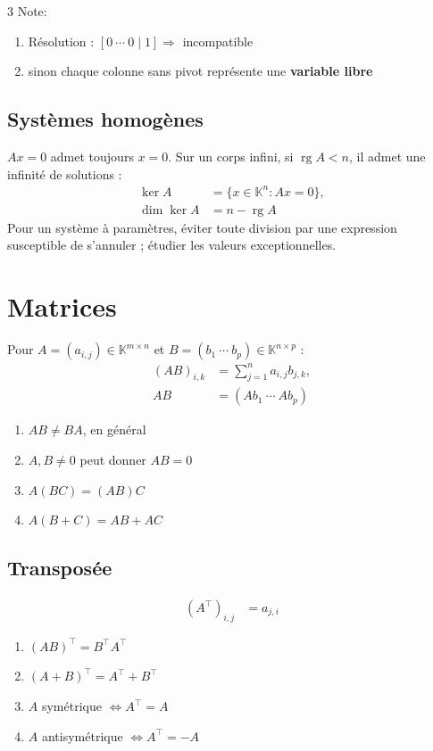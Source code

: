 \documentclass[12pt, a4paper]{article}
\newcommand{\KK}{\mathbb{K}}
\newcommand{\rg}{\operatorname{rg}}
\begin{document}
\begin{multicols*}{3}
Note:
\begin{enumerate}
  \item Résolution : $[0\ \cdots\ 0\mid1]\Rightarrow$ incompatible
  \item sinon chaque colonne sans pivot représente une \textbf{variable libre}
\end{enumerate}

\subsection{Systèmes homogènes}
$Ax=0$ admet toujours $x=0$. Sur un corps infini, si $\rg A<n$, il admet une infinité de solutions :
\begin{align*}
\ker A&=\{x\in\KK^n:Ax=0\},\\
\dim\ker A&=n-\rg A
\end{align*}
Pour un système à paramètres, éviter toute division par une expression susceptible de s'annuler ; étudier les valeurs exceptionnelles.

\colbreak

\section{Matrices}
Pour $A=(a_{i,j})\in\KK^{m\times n}$ et $B=(b_1\ \cdots\ b_p)\in\KK^{n\times p}$ :
\begin{align*}
(AB)_{i,k}&=\sum_{j=1}^n a_{i,j}b_{j,k},\\
AB&=(Ab_1\ \cdots\ Ab_p)
\end{align*}
\begin{enumerate}
  \item $AB \neq BA$, en général 
  \item $A,B\ne0$ peut donner $AB=0$ 
  \item $A(BC)=(AB)C$
  \item $A(B+C)=AB+AC$ 
\end{enumerate}

\subsection{Transposée}
\begin{align*}
(A^\top)_{i,j}&=a_{j,i}
\end{align*}
\begin{enumerate}
  \item $(AB)^\top=B^\top A^\top$
  \item $(A+B)^\top=A^\top+B^\top$ 
  \item $A$ symétrique $\iff A^\top=A$ 
  \item $A$ antisymétrique $\iff A^\top = -A$
\end{enumerate}


\end{multicols*}
\end{document}
